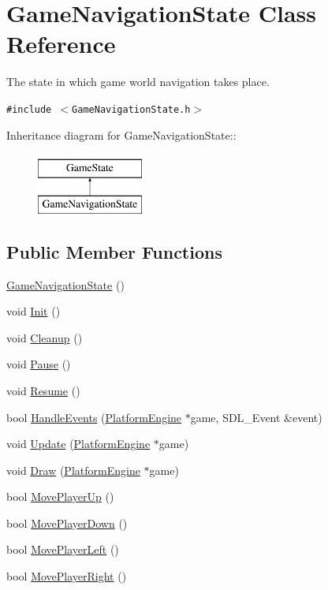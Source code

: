 \hypertarget{class_game_navigation_state}{
\section{GameNavigationState Class Reference}
\label{class_game_navigation_state}
}
The state in which game world navigation takes place.  


{\tt \#include $<$GameNavigationState.h$>$}

Inheritance diagram for GameNavigationState::\begin{figure}[H]
\begin{center}
\leavevmode
\includegraphics[height=2cm]{class_game_navigation_state}
\end{center}
\end{figure}
\subsection*{Public Member Functions}
\begin{CompactItemize}
\item 
\hyperlink{class_game_navigation_state_6a3b93831c85eb5dc3de0a53ca13ddfc}{GameNavigationState} ()
\item 
void \hyperlink{class_game_navigation_state_8f613860bf544476ab9cff9fb7f98201}{Init} ()
\item 
void \hyperlink{class_game_navigation_state_f93a7dbb7eac4b14a6d59cbca32b9abd}{Cleanup} ()
\item 
void \hyperlink{class_game_navigation_state_ac626b511de8af9f32b7a1492a10f861}{Pause} ()
\item 
void \hyperlink{class_game_navigation_state_4d6aee55eddb1978f493206d985fb950}{Resume} ()
\item 
bool \hyperlink{class_game_navigation_state_6e7c13d35a33478673c62ae55394cfdc}{HandleEvents} (\hyperlink{class_platform_engine}{PlatformEngine} $\ast$game, SDL\_\-Event \&event)
\item 
void \hyperlink{class_game_navigation_state_90f5e6d6287a875d8f2737180f46a004}{Update} (\hyperlink{class_platform_engine}{PlatformEngine} $\ast$game)
\item 
void \hyperlink{class_game_navigation_state_a37dce070a906454c512192c067fda09}{Draw} (\hyperlink{class_platform_engine}{PlatformEngine} $\ast$game)
\item 
bool \hyperlink{class_game_navigation_state_fd803365fe0a32b60cf9105ee45b4042}{MovePlayerUp} ()
\item 
bool \hyperlink{class_game_navigation_state_66f8a21e63270473d88b31b06d306111}{MovePlayerDown} ()
\item 
bool \hyperlink{class_game_navigation_state_b8ee346a4f4be2cc3478fdacfb770464}{MovePlayerLeft} ()
\item 
bool \hyperlink{class_game_navigation_state_0b505a64bcf97883bb9e15d0d008174e}{MovePlayerRight} ()
\end{CompactItemize}

